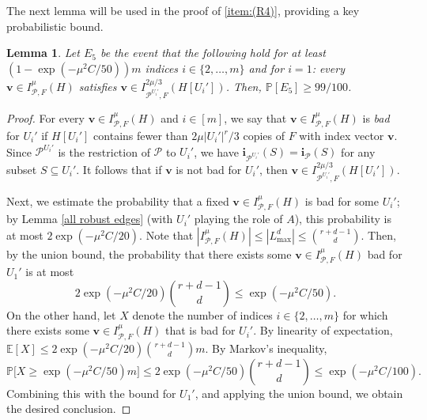 \documentclass[11pt, letterpaper]{amsart}
\theoremstyle{plain}
\numberwithin{equation}{section}
\newtheorem{lemma}[thm]{Lemma}
\theoremstyle{definition}
\newcommand\card[1]{\left| #1 \right|}
\newcommand\cardi[1]{| #1 |}
\renewcommand{\vec}[1]{{\mathbf #1}}
\begin{document}
The next lemma will be used in the proof of \ref{item:(R4)}, providing a key probabilistic bound. 
        
\begin{lemma}\label{index vector of random cluster}
Let $E_5$ be the event that the following hold for at least $\left(1-\exp{(-\mu^2C/50)}\right)m$ indices $i\in\{2,\dots,m\}$ and for $i=1$:
every $\vec{v}\in I_{\mathcal{P},F}^{\mu}(H)$ satisfies $\vec{v}\in I_{\mathcal{P}^{U_i'},F}^{2\mu/3}(H[U_i'])$. 
Then, $\mathbb{P}\left[E_5\right]\ge 99/100$.
\end{lemma}
\begin{proof}
For every $\vec{v}\in I_{\mathcal{P},F}^{\mu}(H)$ and $i\in[m]$, we say that $\vec{v}\in I_{\mathcal{P},F}^{\mu}(H)$ is \emph{bad} for $U_i'$ if $H[U_i']$ contains fewer than $2\mu {|U_i'|}^r/3$ copies of $F$ with index vector $\vec{v}$. 
Since \( \mathcal{P}^{U_i'} \) is the restriction of \( \mathcal{P} \) to \( U_i' \), we have \(\vec{i}_{\mathcal{P}^{U_i'}}(S)=\vec{i}_{\mathcal{P}}(S)\) for any subset \(S\subseteq U_i'\). 
It follows that if $\vec{v}$ is not bad for $U_i'$, then $\vec{v}\in I_{\mathcal{P}^{U_i'},F}^{2\mu/3}(H[U_i'])$. 

Next, we estimate the probability that a fixed $\vec{v}\in I_{\mathcal{P},F}^{\mu}(H)$ is bad for some $U_i'$; by Lemma \ref{all robust edges} (with $U_i'$ playing the role of $A$), this probability is at most $2\exp{(-\mu^2C/20)}$. 
Note that $\cardi{I_{\mathcal{P},F}^{\mu}(H)}\le \cardi{L_{\max}^d}\le \binom{r+d-1}{d}$.
Then, by the union bound, the probability that there exists some \(\vec{v}\in I_{\mathcal{P},F}^{\mu}(H)\) bad for \(U_1'\) is at most \[2\exp{(-\mu^2C/20)}\binom{r+d-1}{d}\le \exp{(-\mu^2C/50)}.\] 
On the other hand, let $X$ denote the number of indices \(i\in \{2,\dots,m\}\) for which there exists some $\vec{v}\in I_{\mathcal{P},F}^{\mu}(H)$ that is bad for $U_i'$. 
By linearity of expectation, $\mathbb{E}[X]\le 2\exp{(-\mu^2C/20)}\binom{r+d-1}{d}m.$ 
By Markov's inequality, \[\mathbb{P}\big[X\ge\exp{(-\mu^2C/50)}m\big]\le 2\exp{(-\mu^2C/50)}\binom{r+d-1}{d}\le \exp{(-\mu^2C/100)}.\] 
Combining this with the bound for \(U_1'\), and applying the union bound, we obtain the desired conclusion.
\end{proof}
\end{document}
